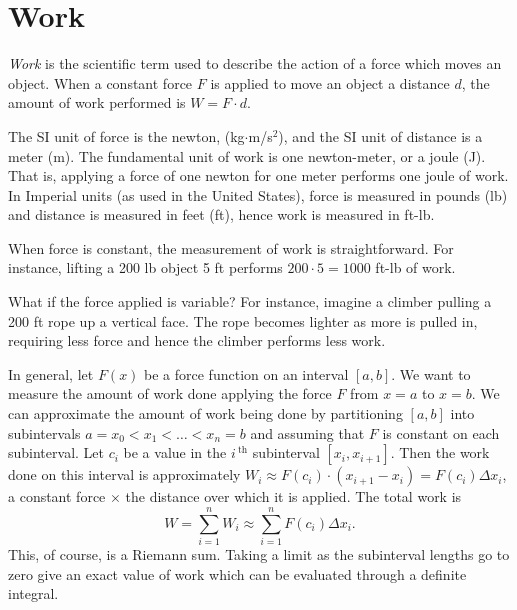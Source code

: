 \section{Work}\label{sec:work}

\textit{Work} is the scientific term used to describe the action of a force which moves an object. When a constant force $F$ is applied to move an object a distance $d$, the amount of work performed is $W=F\cdot d$. 

The SI unit of force is the newton, (kg$\cdot$m/s$^2$), and the SI unit of distance is a meter (m). The fundamental unit of work is one newton-meter, or a joule (J). That is, applying a force of one newton for one meter performs one joule of work. In Imperial units (as used in the United States), force is measured in pounds (lb) and distance is measured in feet (ft), hence work is measured in ft-lb. 


When force is constant, the measurement of work is straightforward. For instance, lifting a 200 lb object 5 ft performs $200\cdot 5 = 1000$ ft-lb of work. 

What if the force applied is variable? For instance, imagine a climber pulling a 200 ft rope up a vertical face. The rope becomes lighter as more is pulled in, requiring less force and hence the climber performs less work.

In general, let $F(x)$ be a force function on an interval $[a,b]$. We want to measure the amount of work done applying the force $F$ from $x=a$ to $x=b$. We can approximate the amount of work being done by partitioning $[a,b]$ into subintervals $a=x_0<x_1 <\dots <x_n=b$ and assuming that $F$ is constant on each subinterval. Let $c_i$ be a value in the $i\,^{\text{th}}$ subinterval $[x_i,x_{i+1}]$. Then the work done on this interval is approximately $W_i\approx F(c_i)\cdot(x_{i+1}-x_i) = F(c_i)\Delta x_i$, a constant force $\times$ the distance over which it is applied. The total work is 
\[ W = \sum_{i=1}^n W_i \approx \sum_{i=1}^n F(c_i)\Delta x_i.\]
This, of course, is a Riemann sum. Taking a limit as the subinterval lengths go to zero give an exact value of work which can be evaluated through a definite integral.

